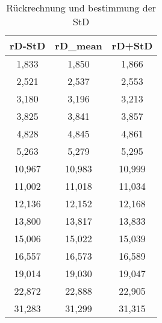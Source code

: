 \begin{table}[H]
  \centering
  \caption{Rückrechnung und bestimmung der StD}
    \begin{tabular}{ccc}
    \toprule
    \multicolumn{1}{l}{\textbf{rD-StD}} & \multicolumn{1}{l}{\textbf{rD_mean}} & \multicolumn{1}{l}{\textbf{rD+StD}} \\
    \midrule
    1,833 & 1,850 & 1,866 \\
    2,521 & 2,537 & 2,553 \\
    3,180 & 3,196 & 3,213 \\
    3,825 & 3,841 & 3,857 \\
    4,828 & 4,845 & 4,861 \\
    5,263 & 5,279 & 5,295 \\
    10,967 & 10,983 & 10,999 \\
    11,002 & 11,018 & 11,034 \\
    12,136 & 12,152 & 12,168 \\
    13,800 & 13,817 & 13,833 \\
    15,006 & 15,022 & 15,039 \\
    16,557 & 16,573 & 16,589 \\
    19,014 & 19,030 & 19,047 \\
    22,872 & 22,888 & 22,905 \\
    31,283 & 31,299 & 31,315 \\
    \bottomrule
    \end{tabular}%
  \label{tab:addlabel}%
\end{table}%
